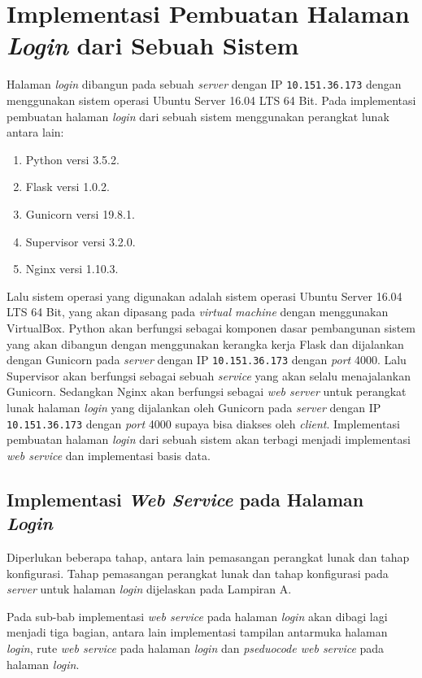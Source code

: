 \section{Implementasi Pembuatan Halaman \textit{Login} dari Sebuah Sistem}
Halaman \textit{login} dibangun pada sebuah \textit{server} dengan IP \texttt{10.151.36.173} dengan menggunakan sistem operasi Ubuntu Server 16.04 LTS 64 Bit. Pada implementasi pembuatan halaman \textit{login} dari sebuah sistem menggunakan perangkat lunak antara lain:
\begin{enumerate}
	\item Python versi 3.5.2.
	\item Flask versi 1.0.2.
	\item Gunicorn versi 19.8.1.
	\item Supervisor versi 3.2.0.
	\item Nginx versi 1.10.3.
\end{enumerate}

Lalu sistem operasi yang digunakan adalah sistem operasi Ubuntu Server 16.04 LTS 64 Bit, yang akan dipasang pada \textit{virtual machine} dengan menggunakan VirtualBox. Python akan berfungsi sebagai komponen dasar pembangunan sistem yang akan dibangun dengan menggunakan kerangka kerja Flask dan dijalankan dengan Gunicorn pada \textit{server} dengan IP \texttt{10.151.36.173} dengan \textit{port} 4000. Lalu Supervisor akan berfungsi sebagai sebuah \textit{service} yang akan selalu menajalankan Gunicorn. Sedangkan Nginx akan berfungsi sebagai \textit{web server} untuk perangkat lunak halaman \textit{login} yang dijalankan oleh Gunicorn pada \textit{server} dengan IP \texttt{10.151.36.173} dengan \textit{port} 4000 supaya bisa diakses oleh \textit{client}. Implementasi pembuatan halaman \textit{login} dari sebuah sistem akan terbagi menjadi implementasi \textit{web service} dan implementasi basis data.

\subsection{Implementasi \textit{Web Service} pada Halaman \textit{Login}}
Diperlukan beberapa tahap, antara lain pemasangan perangkat lunak dan tahap konfigurasi. Tahap pemasangan perangkat lunak dan tahap konfigurasi pada \textit{server} untuk halaman \textit{login} dijelaskan pada Lampiran A. 

Pada sub-bab implementasi \textit{web service} pada halaman \textit{login} akan dibagi lagi menjadi tiga bagian, antara lain implementasi tampilan antarmuka halaman \textit{login}, rute \textit{web service} pada halaman \textit{login} dan \textit{pseduocode web service} pada halaman \textit{login}.

